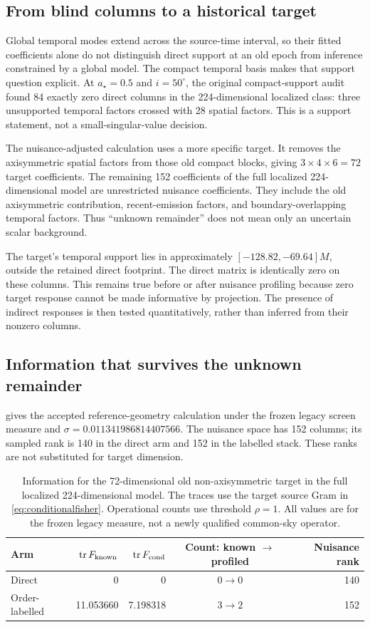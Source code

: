 \subsection{From blind columns to a historical target}
Global temporal modes extend across the source-time interval, so their fitted coefficients alone do not distinguish direct support at an old epoch from inference constrained by a global model. The compact temporal basis makes that support question explicit. At $a_\star=0.5$ and $i=50^\circ$, the original compact-support audit found 84 exactly zero direct columns in the 224-dimensional localized class: three unsupported temporal factors crossed with 28 spatial factors. This is a support statement, not a small-singular-value decision.

The nuisance-adjusted calculation uses a more specific target. It removes the axisymmetric spatial factors from those old compact blocks, giving $3\times4\times6=72$ target coefficients. The remaining 152 coefficients of the full localized 224-dimensional model are unrestricted nuisance coefficients. They include the old axisymmetric contribution, recent-emission factors, and boundary-overlapping temporal factors. Thus ``unknown remainder'' does not mean only an uncertain scalar background.

The target's temporal support lies in approximately $[-128.82,-69.64]M$, outside the retained direct footprint. The direct matrix is identically zero on these columns. This remains true before or after nuisance profiling because zero target response cannot be made informative by projection. The presence of indirect responses is then tested quantitatively, rather than inferred from their nonzero columns.

\subsection{Information that survives the unknown remainder}
 gives the accepted reference-geometry calculation under the frozen legacy screen measure and $\sigma=0.011341986814407566$. The nuisance space has 152 columns; its sampled rank is 140 in the direct arm and 152 in the labelled stack. These ranks are not substituted for target dimension.

\begin{table}[htbp]
\centering\small
\caption{Information for the 72-dimensional old non-axisymmetric target in the full localized 224-dimensional model. The traces use the target source Gram in \eqref{eq:conditionalfisher}. Operational counts use threshold $\rho=1$. All values are for the frozen legacy measure, not a newly qualified common-sky operator.}
\label{tab:r2}
\begin{tabular}{l r r c r}
\toprule
Arm&$\operatorname{tr} F_{\rm known}$&$\operatorname{tr} F_{\rm cond}$&Count: known $\to$ profiled&Nuisance rank\\
\midrule
Direct&0&0&$0\to0$&140\\
Order-labelled&11.053660&7.198318&$3\to2$&152\\
\bottomrule
\end{tabular}
\end{table}

